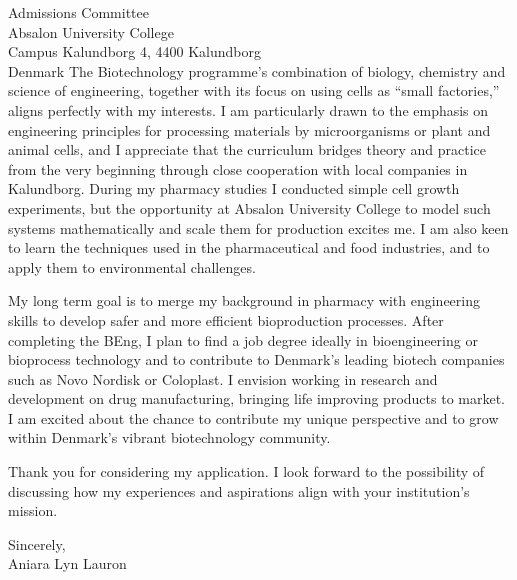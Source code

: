 \documentclass[11pt,a4paper]{letter}
\begin{document}
\begin{letter}{Admissions Committee \\ Absalon University College \\ Campus Kalundborg 4, 4400 Kalundborg\\ Denmark}
The Biotechnology programme’s combination of biology, chemistry and science of engineering, together with its focus on using cells as “small factories,” aligns perfectly with my interests. I am particularly drawn to the emphasis on engineering principles for processing materials by microorganisms or plant and animal cells, and I appreciate that the curriculum bridges theory and practice from the very beginning through close cooperation with local companies in Kalundborg. During my pharmacy studies I conducted simple cell growth experiments, but the opportunity at Absalon University College to model such systems mathematically and scale them for production excites me. I am also keen to learn the techniques used in the pharmaceutical and food industries, and to apply them to environmental challenges.

My long term goal is to merge my background in pharmacy with engineering skills to develop safer and more efficient bioproduction processes. After completing the BEng, I plan to find a job degree ideally in bioengineering or bioprocess technology and to contribute to Denmark’s leading biotech companies such as Novo Nordisk or Coloplast. I envision working in research and development on drug manufacturing, bringing life improving products to market. I am excited about the chance to contribute my unique perspective and to grow within Denmark’s vibrant biotechnology community.

Thank you for considering my application. I look forward to the possibility of discussing how my experiences and aspirations align with your institution’s mission.

\closing{Sincerely, \\
Aniara Lyn Lauron}

\end{letter}
\end{document}
